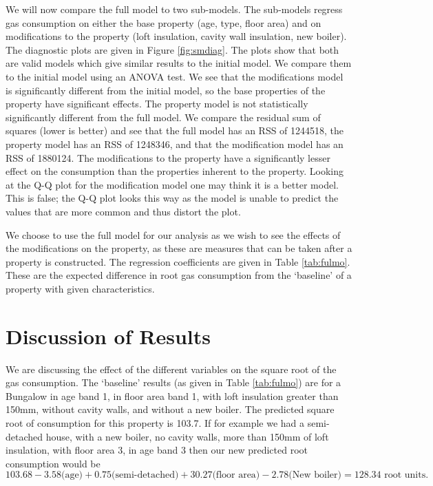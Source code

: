 \documentclass[]{extarticle}
\begin{document}
We will now compare the full model to two sub-models. The sub-models regress gas consumption on either the base property (age, type, floor area) and on modifications to the property (loft insulation, cavity wall insulation, new boiler). The diagnostic plots are given in Figure \ref{fig:smdiag}. The plots show that both are valid models which give similar results to the initial model. We compare them to the initial model using an ANOVA test. We see that the modifications model is significantly different from the initial model, so the base properties of the property have significant effects. The property model is not statistically significantly different from the full model.  We compare the residual sum of squares (lower is better) and see that the full model has an RSS of 1244518, the property model has an RSS of 1248346, and that the modification model has an RSS of 1880124. The modifications to the property have a significantly lesser effect on the consumption than the properties inherent to the property. Looking at the Q-Q plot for the modification model one may think it is a better model. This is false; the Q-Q plot looks this way as the model is unable to predict the values that are more common and thus distort the plot. 

We choose to use the full model for our analysis as we wish to see the effects of the modifications on the property, as these are measures that can be taken after a property is constructed. The regression coefficients are given in Table \ref{tab:fulmo}. These are the expected difference in root gas consumption from the `baseline' of a property with given characteristics.

\section{Discussion of Results}

We are discussing the effect of the different variables on the square root of the gas consumption. The `baseline' results (as given in Table \ref{tab:fulmo}) are for a Bungalow in age band 1, in floor area band 1, with loft insulation greater than 150mm, without cavity walls, and without a new boiler. The predicted square root of consumption for this property is 103.7. If for example we had a semi-detached house, with a new boiler, no cavity walls, more than 150mm of loft insulation, with floor area 3, in age band 3 then our new predicted root consumption would be $$103.68 - 3.58 \text{(age)} + 0.75 \text{(semi-detached)} + 30.27 \text{(floor area)} - 2.78 \text{(New boiler)} = 128.34 \text{ root units}.$$
\end{document}
